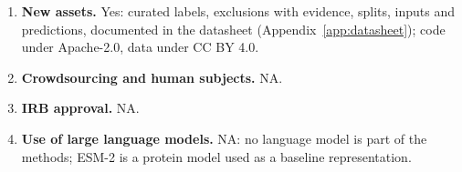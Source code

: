 \begin{enumerate}
\citep{weissman2021}, GTDB \citep{parks2022}, the GEM catalog \citep{nayfach2021}, gRodon and Phydon (MIT), ESM-2 (MIT),
pyrodigal (GPL-3.0), scikit-learn (BSD-3-Clause); upstream data keep their terms.
\item \textbf{New assets.} Yes: curated labels, exclusions with evidence, splits, inputs and predictions, documented in the
datasheet (Appendix~\ref{app:datasheet}); code under Apache-2.0, data under CC BY 4.0.
\item \textbf{Crowdsourcing and human subjects.} NA.
\item \textbf{IRB approval.} NA.
\item \textbf{Use of large language models.} NA: no language model is part of the methods; ESM-2 is a protein model used as
a baseline representation.
\end{enumerate}
